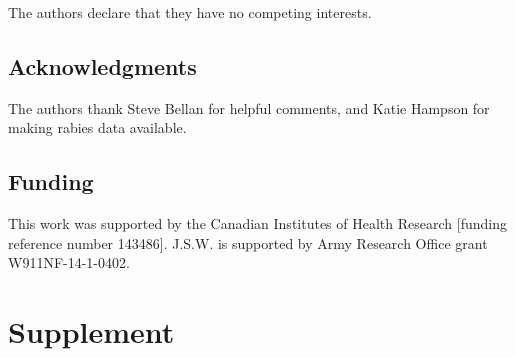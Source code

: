 \documentclass[12pt]{article}
\begin{document}
The authors declare that they have no competing interests.

\subsection*{Acknowledgments}

The authors thank Steve Bellan for helpful comments, and Katie Hampson for making rabies data available.

\subsection*{Funding}

This work was supported by the Canadian Institutes of Health Research [funding reference number 143486]. J.S.W. is supported by Army Research Office grant W911NF-14-1-0402.

\printbibliography

\clearpage

\setcounter{figure}{0}
\setcounter{page}{1}
\setcounter{section}{0}

\renewcommand{\thefigure}{S\arabic{figure}}
\renewcommand{\thesection}{S\arabic{section}}

\section{Supplement}


\end{document}

